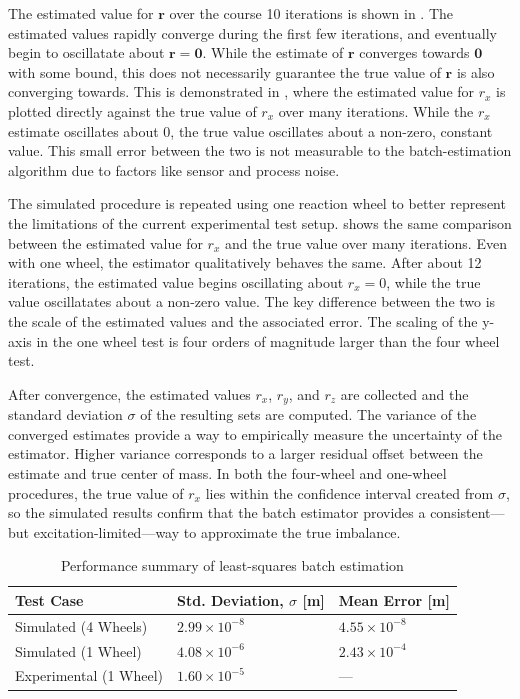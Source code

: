 The estimated value for $\bm{r}$ over the course 10 iterations is shown in . The estimated values rapidly converge during the first few iterations, and eventually begin to oscillatate about $\bm{r}=\bm{0}$. While the estimate of $\bm{r}$ converges towards $\bm{0}$ with some bound, this does not necessarily guarantee the true value of $\bm{r}$ is also converging towards. This is demonstrated in , where the estimated value for $r_x$ is plotted directly against the true value of $r_x$ over many iterations. While the $r_x$ estimate oscillates about 0, the true value oscillates about a non-zero, constant value. This small error between the two is not measurable to the batch-estimation algorithm due to factors like sensor and process noise. 

The simulated procedure is repeated using one reaction wheel to better represent the limitations of the current experimental test setup.  shows the same comparison between the estimated value for $r_x$ and the true value over many iterations. Even with one wheel, the estimator qualitatively behaves the same. After about 12 iterations, the estimated value begins oscillating about $r_x=0$, while the true value oscillatates about a non-zero value. The key difference between the two is the scale of the estimated values and the associated error. The scaling of the y-axis in the one wheel test is four orders of magnitude larger than the four wheel test.

After convergence, the estimated values $r_x$, $r_y$, and $r_z$ are collected and the standard deviation $\sigma$ of the resulting sets are computed. The variance of the converged estimates provide a way to empirically measure the uncertainty of the estimator. Higher variance corresponds to a larger residual offset between the estimate and true center of mass. In both the four-wheel and one-wheel procedures, the true value of $r_x$ lies within the confidence interval created from $\sigma$, so the simulated results confirm that the batch estimator provides a consistent---but excitation-limited---way to approximate the true imbalance. 

\begin{table}[h!]
\caption{Performance summary of least-squares batch estimation}
\label{table:LSR_table}
\centering
\renewcommand{\arraystretch}{1.3} %
\begin{tabularx}{\textwidth}{
    >{\raggedright\arraybackslash}p{4.4cm}   %
    >{\centering\arraybackslash}p{4.4cm}     %
    >{\centering\arraybackslash}X     %
}
\hline
\textbf{Test Case} &
\textbf{Std. Deviation, $\sigma$ [m]} &
\textbf{Mean Error [m]} \\
\hline
Simulated (4 Wheels) &
$2.99\times10^{-8}$ &
$4.55\times10^{-8}$ \\[1.2em]

Simulated (1 Wheel) &
$4.08\times10^{-6}$ &
$2.43\times10^{-4}$ \\[1.2em]

Experimental (1 Wheel) &
$1.60\times10^{-5}$ &
--- \\ 
\hline
\end{tabularx}
\end{table}

